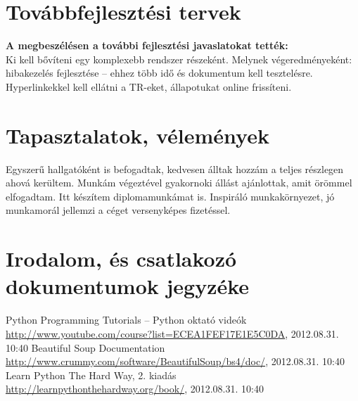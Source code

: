 \documentclass[a4paper,oneside,12pt]{article}
\begin{document}
\section{Továbbfejlesztési tervek}
\textbf{A megbeszélésen a további fejlesztési javaslatokat tették:}\\
Ki kell bővíteni egy komplexebb rendszer részeként. Melynek végeredményeként: hibakezelés fejlesztése -- ehhez több idő és dokumentum kell tesztelésre. Hyperlinkekkel  kell ellátni a TR-eket, állapotukat online frissíteni.
%
\section{Tapasztalatok, vélemények}
Egyszerű hallgatóként is befogadtak, kedvesen álltak hozzám a teljes részlegen ahová kerültem. Munkám végeztével gyakornoki állást ajánlottak, amit örömmel elfogadtam. Itt készítem diplomamunkámat is. Inspiráló munkakörnyezet, jó munkamorál jellemzi a céget versenyképes fizetéssel.
%
\newpage
\section{Irodalom, és csatlakozó dokumentumok jegyzéke}
\label{sec:irod}
\begin{thebibliography}{9}
 Python Programming Tutorials -- Python oktató videók \href{http://www.youtube.com/course?list=ECEA1FEF17E1E5C0DA}{http://www.youtube.com/course?list=ECEA1FEF17E1E5C0DA}, 2012.08.31. 10:40
 Beautiful Soup Documentation \href{http://www.crummy.com/software/BeautifulSoup/bs4/doc/}{http://www.crummy.com/software/BeautifulSoup/bs4/doc/}, 2012.08.31. 10:40
 Learn Python The Hard Way, 2. kiadás \href{http://learnpythonthehardway.org/book/}{http://learnpythonthehardway.org/book/}, 2012.08.31. 10:40
\end{thebibliography}
%
\newpage
\end{document}
